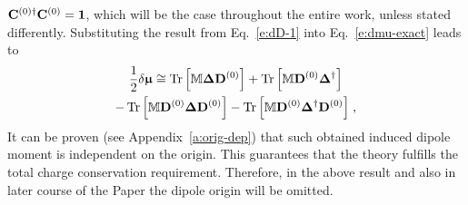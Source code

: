 \documentclass[aip,amsmath,amssymb,reprint,floatfix]{revtex4-1}
\newcommand{\BM}[1]{\bm{#1}}
\DeclareMathOperator{\Tr}{Tr}
\begin{document}
${\bf C}^{(0)\dagger}{\bf C}^{(0)}={\bf 1}$,
which will be the case throughout the entire work, unless stated differently.
Substituting the result from Eq.~\eqref{e:dD-1}
into Eq.~\eqref{e:dmu-exact} leads to
%
\begin{multline} \label{e:dmu-4-exact.linear-approximation}
 \frac{1}{2} 
 \delta {\BM{\upmu}}
  \cong
   \Tr{ 
    \left[ 
         {\mathbb{M}} {\BM\Delta} {\bf D}^{(0)}  
    \right] }
%
  +\Tr{ 
    \left[ 
         {\mathbb{M}} {\bf D}^{(0)} {\BM\Delta}^{\dagger}
    \right] } \\
%
  -\Tr{ 
    \left[ 
         {\mathbb{M}} {\bf D}^{(0)} {\BM\Delta} {\bf D}^{(0)}
    \right] }
%
  -\Tr{ 
    \left[ 
         {\mathbb{M}} {\bf D}^{(0)} {\BM\Delta}^{\dagger} {\bf D}^{(0)}
    \right] } \;,
\end{multline}
%
It can be proven (see Appendix~\ref{a:orig-dep}) that such obtained
induced dipole moment is independent on the origin. 
This guarantees that the theory fulfills the total charge conservation requirement.
Therefore,
in the above result and also in later course of the Paper the dipole origin will be omitted. 
\end{document}
